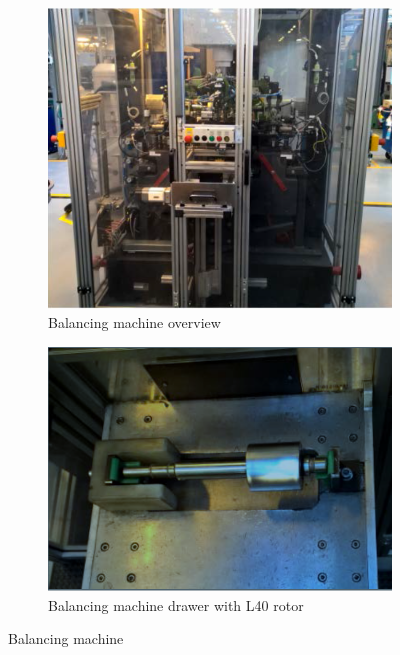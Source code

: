 \begin{figure}[h!]
\centering
    \begin{subfigure}{.49\textwidth}
        \centering
        \includegraphics[width=\textwidth]{InitialProblemstatement/Case/balancing.PNG} 
        \caption{Balancing machine overview}
        \label{fig:balancing}
    \end{subfigure}
    \begin{subfigure}{.49\textwidth}
        \centering
        \includegraphics[width=\textwidth]{InitialProblemstatement/Case/Rotor.PNG}
        \caption{Balancing machine drawer with L40 rotor}
        \label{fig:Rotor} 
    \end{subfigure}
\caption{Balancing machine\cite{Case}}
\label{fig:BalancingMachine}
\end{figure}

